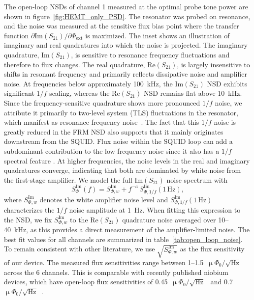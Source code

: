 \documentclass[
 prd,
 reprint,
 superscriptaddress,
 amsmath,amssymb,
 aps,
 floatfix,
]{revtex4-2}
\newcommand{\uPhirtHz}{$\upmu \Phi_0/\sqrt{\text{Hz}}$\xspace}
\begin{document}
The open-loop NSDs of channel 1 measured at the optimal probe tone power are shown in figure~\ref{fig:HEMT_only_PSD}. The resonator was probed on resonance, and the noise was measured at the sensitive flux bias point where the transfer function $\partial \mathrm{Im}(S_{21})/\partial \Phi_{\mathrm{ext}}$ is maximized. The inset shows an illustration of imaginary and real quadratures into which the noise is projected. The imaginary quadrature, $\mathrm{Im}(S_{21})$, is sensitive to resonance frequency fluctuations and therefore to flux changes. The real quadrature, $\mathrm{Re}(S_{21})$, is largely insensitive to shifts in resonant frequency and primarily reflects dissipative noise and amplifier noise. At frequencies below approximately \qty{100}{\kHz}, the $\mathrm{Im}(S_{21})$ NSD exhibits significant $1/f$ scaling, whereas the $\mathrm{Re}(S_{21})$ NSD remains flat above \qty{10}{\kHz}. Since the frequency-sensitive quadrature shows more pronounced $1/f$ noise, we attribute it primarily to two-level system (TLS) fluctuations in the resonator, which manifest as resonance frequency noise~\cite{gao_noise_2007, kumar_temperature_2008}. The fact that this $1/f$ noise is greatly reduced in the FRM NSD also supports that it mainly originates downstream from the SQUID. Flux noise within the SQUID loop can add a subdominant contribution to the low frequency noise since it also has a $1/f$ spectral feature \cite{wellstood_low-frequency_1987, rower_evolution_2023}. At higher frequencies, the noise levels in the real and imaginary quadratures converge, indicating that both are dominated by white noise from the first-stage amplifier. We model the full $\text{Im}(S_{21})$ noise spectrum with
\begin{equation}
S^{\mathrm{Im}}_{\Phi}(f) = S^{\mathrm{Im}}_{\Phi,w} + f^{-a} \, S^{\mathrm{Im}}_{\Phi,1/f}(1\,\mathrm{Hz}),
\end{equation}
where $S^{\mathrm{Im}}_{\Phi,w}$ denotes the white amplifier noise level and $S^{\mathrm{Im}}_{\Phi,1/f}(1\,\mathrm{Hz})$ characterizes the $1/f$ noise amplitude at \qty{1}{Hz}. When fitting this expression to the NSD, we fix $S^{\mathrm{Im}}_{\Phi,w}$ to the $\mathrm{Re}(S_{21})$ quadrature noise averaged over 10--\qty{40}{\kHz}, as this provides a direct measurement of the amplifier-limited noise. The best fit values for all channels are summarized in table~\ref{tab:open_loop_noise}. To remain consistent with other literature, we use $\sqrt{S^{\mathrm{Im}}_{\Phi,w}}$ as the flux sensitivity of our device. The measured flux sensitivities range between 1--1.5~\uPhirtHz across the 6 channels. This is comparable with recently published niobium devices, which have open-loop flux sensitivities of 0.45~\uPhirtHz~\cite{malnou_improved_2023} and 0.7~\uPhirtHz~\cite{neidig_full-scale_2025}.
\end{document}
